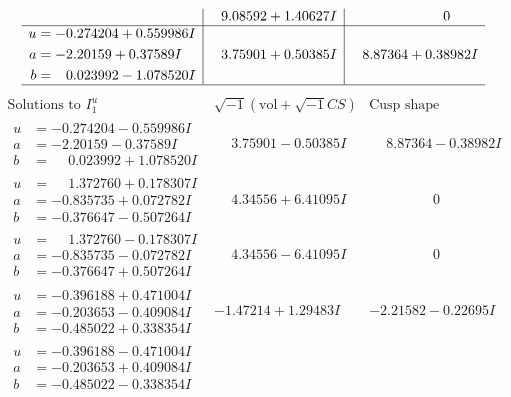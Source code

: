 \documentclass[1p]{elsarticle_modified}
\theoremstyle{definition}
\newcommand{\I}{\sqrt{-1}}
\begin{document}
$$\begin{array}{c|c|c}
 & \phantom{-}9.08592 + 1.40627 I & \phantom{-0.000000 } 0 \\ \hline\begin{aligned}
u &= -0.274204 + 0.559986 I \\
a &= -2.20159 + 0.37589 I \\
b &= \phantom{-}0.023992 - 1.078520 I\end{aligned}
 & \phantom{-}3.75901 + 0.50385 I & \phantom{-}8.87364 + 0.38982 I\\
 \hline 
 \end{array}$$\newpage$$\begin{array}{c|c|c}  
\text{Solutions to }I^u_{1}& \I (\text{vol} + \sqrt{-1}CS) & \text{Cusp shape}\\
 \hline 
\begin{aligned}
u &= -0.274204 - 0.559986 I \\
a &= -2.20159 - 0.37589 I \\
b &= \phantom{-}0.023992 + 1.078520 I\end{aligned}
 & \phantom{-}3.75901 - 0.50385 I & \phantom{-}8.87364 - 0.38982 I \\ \hline\begin{aligned}
u &= \phantom{-}1.372760 + 0.178307 I \\
a &= -0.835735 + 0.072782 I \\
b &= -0.376647 - 0.507264 I\end{aligned}
 & \phantom{-}4.34556 + 6.41095 I & \phantom{-0.000000 } 0 \\ \hline\begin{aligned}
u &= \phantom{-}1.372760 - 0.178307 I \\
a &= -0.835735 - 0.072782 I \\
b &= -0.376647 + 0.507264 I\end{aligned}
 & \phantom{-}4.34556 - 6.41095 I & \phantom{-0.000000 } 0 \\ \hline\begin{aligned}
u &= -0.396188 + 0.471004 I \\
a &= -0.203653 - 0.409084 I \\
b &= -0.485022 + 0.338354 I\end{aligned}
 & -1.47214 + 1.29483 I & -2.21582 - 0.22695 I \\ \hline\begin{aligned}
u &= -0.396188 - 0.471004 I \\
a &= -0.203653 + 0.409084 I \\
b &= -0.485022 - 0.338354 I\end{aligned}

\end{array}$$
\end{document}
